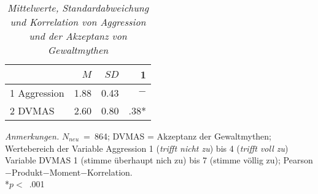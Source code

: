 \begin{table}[htb]
    \caption[Mittelwerte, Standardabweichung und Korrelation von Aggression und der Akzeptanz von Gewaltmythen]{\textit {Mittelwerte, Standardabweichung und Korrelation von Aggression und der Akzeptanz von Gewaltmythen}} 
    \label{H2_Pearson}
    \centering
    \begin{adjustbox}{width=5.5cm} %
    \small
    \begin{tabular}{lrrr}
      \hline
        & $M$   & $SD$ & 1 \\
      \hline
    1 Aggression      & 1.88 & 0.43  & $-$      \\
    2 DVMAS           & 2.60 & 0.80  & .38*      \\
       \hline
    \end{tabular}
    \end{adjustbox}
    
    \begin{tablenotes}
        \item \textit{Anmerkungen.} \( N_{neu} \)~=~864; DVMAS = Akzeptanz der Gewaltmythen; Wertebereich der Variable Aggression 1 (\textit{trifft nicht zu}) bis 4 (\textit{trifft voll zu}) Variable DVMAS 1 (stimme überhaupt nich zu) bis 7 (stimme völlig zu); Pearson$-$Produkt$-$Moment$-$Korrelation. \\ *$p<$~.001
      \end{tablenotes}
    \end{table}

